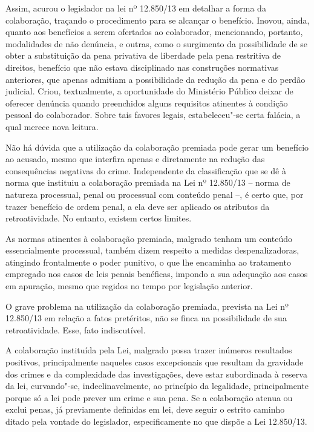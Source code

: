 Assim, acurou o legislador na lei nº 12.850/13 em detalhar a forma da
colaboração, traçando o procedimento para se alcançar o benefício.
Inovou, ainda, quanto aos benefícios a serem ofertados ao colaborador,
mencionando, portanto, modalidades de não denúncia, e outras, como o
surgimento da possibilidade de se obter a substituição da pena privativa
de liberdade pela pena restritiva de direitos, benefício que não estava
disciplinado nas construções normativas anteriores, que apenas admitiam
a possibilidade da redução da pena e do perdão judicial. Criou,
textualmente, a oportunidade do Ministério Público deixar de oferecer
denúncia quando preenchidos alguns requisitos atinentes à condição
pessoal do colaborador. Sobre tais favores legais, estabeleceu"-se certa
falácia, a qual merece nova leitura.

Não há dúvida que a utilização da colaboração premiada pode gerar um
benefício ao acusado, mesmo que interfira apenas e diretamente na
redução das consequências negativas do crime. Independente da
classificação que se dê à norma que instituiu a colaboração premiada na
Lei nº 12.850/13 -- norma de natureza processual, penal ou processual
com conteúdo penal --, é certo que, por trazer benefício de ordem penal,
a ela deve ser aplicado os atributos da retroatividade. No entanto,
existem certos limites.

As normas atinentes à colaboração premiada, malgrado tenham um conteúdo
essencialmente processual, também dizem respeito a medidas
despenalizadoras, atingindo frontalmente o poder punitivo, o que lhe
encaminha ao tratamento empregado nos casos de leis penais benéficas,
impondo a sua adequação aos casos em apuração, mesmo que regidos no
tempo por legislação anterior.

O grave problema na utilização da colaboração premiada, prevista na Lei
nº 12.850/13 em relação a fatos pretéritos, não se finca na
possibilidade de sua retroatividade. Esse, fato indiscutível.

A colaboração instituída pela Lei, malgrado possa trazer inúmeros
resultados positivos, principalmente naqueles casos excepcionais que
resultam da gravidade dos crimes e da complexidade das investigações,
deve estar subordinada à reserva da lei, curvando"-se, indeclinavelmente,
ao princípio da legalidade, principalmente porque só a lei pode prever
um crime e sua pena. Se a colaboração atenua ou exclui penas, já
previamente definidas em lei, deve seguir o estrito caminho ditado pela
vontade do legislador, especificamente no que dispõe a Lei 12.850/13.

